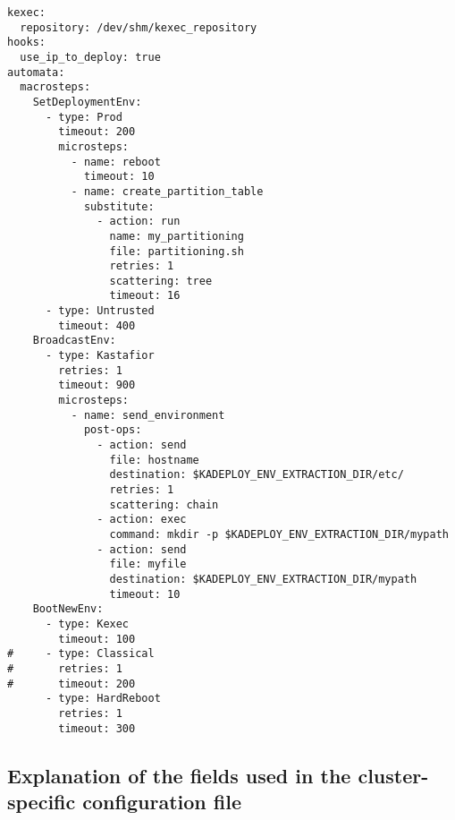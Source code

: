 \documentclass[a4wide,10pt,oneside]{book}
\begin{document}
\begin{small}
\begin{verbatim}
kexec:
  repository: /dev/shm/kexec_repository
hooks:
  use_ip_to_deploy: true
automata: 
  macrosteps:
    SetDeploymentEnv:
      - type: Prod
        timeout: 200
        microsteps:
          - name: reboot
            timeout: 10
          - name: create_partition_table
            substitute:
              - action: run
                name: my_partitioning
                file: partitioning.sh
                retries: 1
                scattering: tree
                timeout: 16
      - type: Untrusted
        timeout: 400
    BroadcastEnv: 
      - type: Kastafior
        retries: 1
        timeout: 900
        microsteps:
          - name: send_environment
            post-ops:
              - action: send
                file: hostname
                destination: $KADEPLOY_ENV_EXTRACTION_DIR/etc/
                retries: 1
                scattering: chain
              - action: exec
                command: mkdir -p $KADEPLOY_ENV_EXTRACTION_DIR/mypath
              - action: send
                file: myfile
                destination: $KADEPLOY_ENV_EXTRACTION_DIR/mypath
                timeout: 10
    BootNewEnv: 
      - type: Kexec
        timeout: 100
#     - type: Classical
#       retries: 1
#       timeout: 200
      - type: HardReboot
        retries: 1
        timeout: 300
\end{verbatim}
\end{small}

\subsection{Explanation of the fields used in the cluster-specific configuration file\label{sec:specific_config}}
\end{document}
